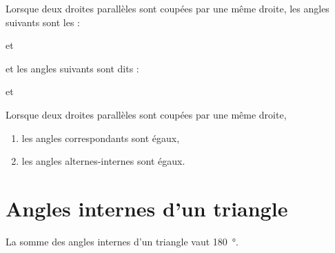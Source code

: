 

\begin{definition}
    Lorsque deux droites parallèles sont coupées par une même droite, les angles suivants sont les  :

\begin{center}
   
   \hfill et\hfill
   
\end{center}

et les angles suivants sont dits  :

\begin{center}
   
   \hfill et\hfill
   
\end{center}

\end{definition}

\begin{propriete}
    Lorsque deux droites parallèles sont coupées par une même droite,
    \begin{enumerate}
        \item
            les angles correspondants sont égaux,
        \item
            les angles alternes-internes sont égaux.
    \end{enumerate}
\end{propriete}

\section{Angles internes d'un triangle}



\begin{theorem}
    La somme des angles internes d'un triangle vaut \SI{180}{\degree}.
\end{theorem}

